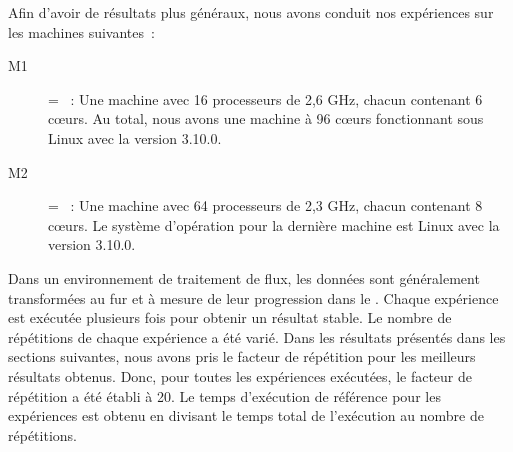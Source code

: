 Afin d'avoir de r\'esultats plus g\'en\'eraux, nous avons conduit nos exp\'eriences sur les machines suivantes~:
\label{machines.sect}

\begin{description}
\item[M1] = ~: Une machine avec 16 processeurs de 2,6 GHz, chacun contenant 6 cœurs. Au total, nous avons une machine à 96 cœurs fonctionnant sous Linux avec la version 3.10.0. 


\item[M2] = ~:  Une machine avec 64 processeurs de 2,3 GHz, chacun contenant 8 cœurs. Le système d'op\'eration pour la derni\`ere machine est Linux avec la version 3.10.0.


\end{description}

Dans un environnement de traitement de flux, les donn\'ees sont g\'en\'eralement transform\'ees au fur et \`a mesure de leur progression dans le . Chaque exp\'erience est ex\'ecut\'ee plusieurs fois pour obtenir un r\'esultat stable. Le nombre de r\'ep\'etitions de chaque exp\'erience a \'et\'e vari\'e. Dans les r\'esultats pr\'esent\'es dans les sections suivantes, nous avons pris le facteur de r\'ep\'etition pour les meilleurs r\'esultats obtenus. Donc, pour toutes les exp\'eriences ex\'ecut\'ees, le facteur de r\'ep\'etition a \'et\'e \'etabli \`a 20. Le temps d'ex\'ecution de r\'ef\'erence pour les exp\'eriences est obtenu en divisant le temps total de l'ex\'ecution au nombre de r\'ep\'etitions.









